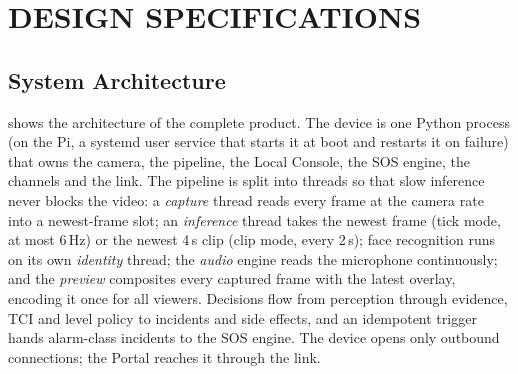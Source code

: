 \chapter{DESIGN SPECIFICATIONS}
\label{ch:design}


\section{System Architecture}
\label{sec:arch}

 shows the architecture of the complete product. The device is one Python process (on the Pi, a systemd user service that starts it at boot and restarts it on failure) that owns the camera, the pipeline, the Local Console, the SOS engine, the channels and the link. The pipeline is split into threads so that slow inference never blocks the video: a \emph{capture} thread reads every frame at the camera rate into a newest-frame slot; an \emph{inference} thread takes the newest frame (tick mode, at most 6\,Hz) or the newest 4\,s clip (clip mode, every 2\,s); face recognition runs on its own \emph{identity} thread; the \emph{audio} engine reads the microphone continuously; and the \emph{preview} composites every captured frame with the latest overlay, encoding it once for all viewers. Decisions flow from perception through evidence, TCI and level policy to incidents and side effects, and an idempotent trigger hands alarm-class incidents to the SOS engine. The device opens only outbound connections; the Portal reaches it through the link.

